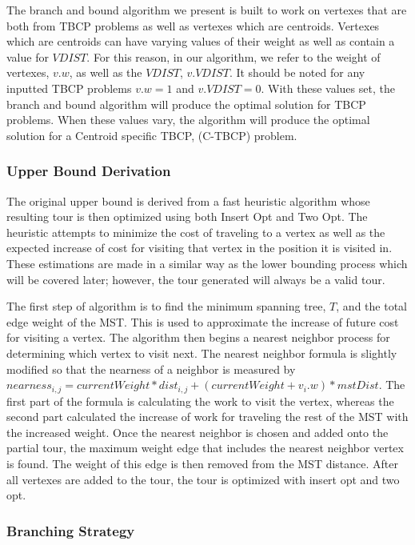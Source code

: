\documentclass[sigconf, anonymous, pdftex]{acmart}
\begin{document}
The branch and bound algorithm we present is built to work on vertexes that are both from TBCP problems as well as vertexes which are centroids. Vertexes which are centroids can have varying values of their weight as well as contain a value for $VDIST$. For this reason, in our algorithm, we refer to the weight of vertexes, $v.w$, as well as the $VDIST$, $v.VDIST$. It should be noted for any inputted TBCP problems $v.w = 1$ and $v.VDIST = 0$. With these values set, the branch and bound algorithm will produce the optimal solution for TBCP problems. When these values vary, the algorithm will produce the optimal solution for a Centroid specific TBCP, (C-TBCP) problem. 

\subsubsection{Upper Bound Derivation}

The original upper bound is derived from a fast heuristic algorithm whose resulting tour is then optimized using both Insert Opt and Two Opt. The heuristic attempts to minimize the cost of traveling to a vertex as well as the expected increase of cost for visiting that vertex in the position it is visited in. These estimations are made in a similar way as the lower bounding process which will be covered later; however, the tour generated will always be a valid tour.

The first step of algorithm is to find the minimum spanning tree, $T$, and the total edge weight of the MST. This is used to approximate the increase of future cost for visiting a vertex. The algorithm then begins a nearest neighbor process for determining which vertex to visit next. The nearest neighbor formula is slightly modified so that the nearness of a neighbor is measured by $nearness_{i, j} = currentWeight * dist_{i, j} + (currentWeight + v_i.w) * mstDist$. The first part of the formula is calculating the work to visit the vertex, whereas the second part calculated the increase of work for traveling the rest of the MST with the increased weight. Once the nearest neighbor is chosen and added onto the partial tour, the maximum weight edge that includes the nearest neighbor vertex is found. The weight of this edge is then removed from the MST distance. After all vertexes are added to the tour, the tour is optimized with insert opt and two opt.

\subsubsection{Branching Strategy}
\end{document}
